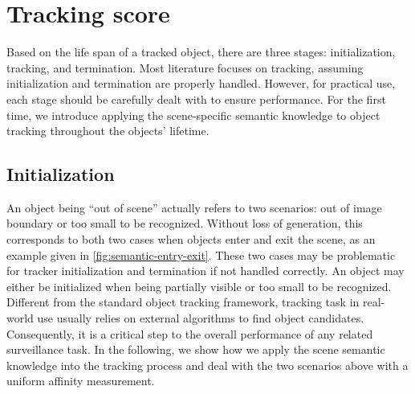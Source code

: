 \section{Tracking score}
Based on the life span of a tracked object, there are three stages: initialization, tracking, and termination. 
Most literature focuses on tracking, assuming initialization and termination are properly handled.
However, for practical use, each stage should be carefully dealt with to ensure performance. 
For the first time, we introduce applying the scene-specific semantic knowledge to object tracking throughout the objects' lifetime. 
\subsection{Initialization}     
    An object being ``out of scene'' actually refers to two scenarios: out of image boundary or too small to be recognized. Without loss of generation, this corresponds to both two cases when objects enter and exit the scene, as an example given in \ref{fig:semantic-entry-exit}. 
    These two cases may be problematic for tracker initialization and termination if not handled correctly. An object may either be initialized when being partially visible or too small to be recognized. 
    Different from the standard object tracking framework, tracking task in real-world use usually relies on external algorithms to find object candidates. Consequently, it is a critical step to the overall performance of any related surveillance task.
    In the following, we show how we apply the scene semantic knowledge into the tracking process and deal with the two scenarios above with a uniform affinity measurement. 

    
    
